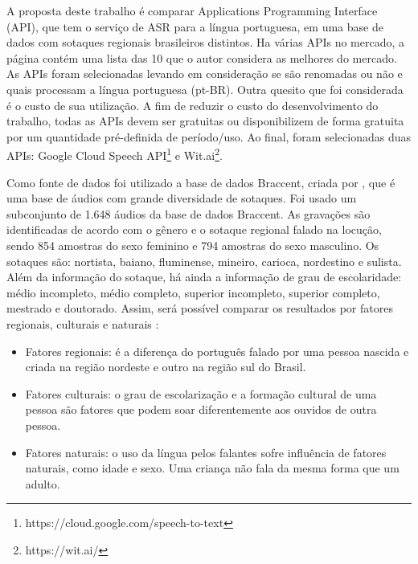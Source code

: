 A proposta deste trabalho é comparar Applications Programming Interface (API),  que tem o serviço de ASR para a língua portuguesa, em uma base de dados com sotaques regionais brasileiros distintos. 
Ha várias APIs no mercado, a página  contém uma lista das 10 que o autor considera as melhores do mercado. As APIs foram selecionadas levando em consideração se são renomadas ou não e quais processam a língua portuguesa (pt-BR). 
Outra quesito que foi considerada é o custo de sua utilização. A fim de reduzir o custo do desenvolvimento do trabalho, todas as APIs devem ser gratuitas ou disponibilizem de forma gratuita por um quantidade pré-definida de período/uso. Ao final, foram selecionadas duas APIs: Google Cloud Speech API\footnote{https://cloud.google.com/speech-to-text} e Wit.ai\footnote{https://wit.ai/}. 

Como fonte de dados foi utilizado a base de dados Braccent, criada por , que é uma base de áudios com grande diversidade de sotaques. Foi usado um subconjunto de 1.648 áudios da base de dados Braccent. As gravações são identificadas de acordo com o gênero e o sotaque regional falado na locução, sendo 854 amostras do sexo feminino e 794 amostras do sexo masculino. Os sotaques são: nortista, baiano, fluminense, mineiro, carioca, nordestino e sulista. Além da informação do sotaque, há ainda a informação de grau de escolaridade: médio incompleto, médio completo, superior incompleto, superior completo, mestrado e doutorado. Assim, será possível comparar os resultados por fatores regionais, culturais e naturais  \cite{correiacomunicaccao}: 

\begin{itemize}
    \item Fatores regionais: é a diferença do português falado por uma pessoa nascida e criada na região nordeste e outro na região sul do Brasil. 
    \item Fatores culturais: o grau de escolarização e a formação cultural de uma pessoa são fatores que podem soar diferentemente aos ouvidos de outra pessoa. 
    \item Fatores naturais: o uso da língua pelos falantes sofre influência de fatores naturais, como idade e sexo. Uma criança não fala da mesma forma que um adulto.
\end{itemize}


